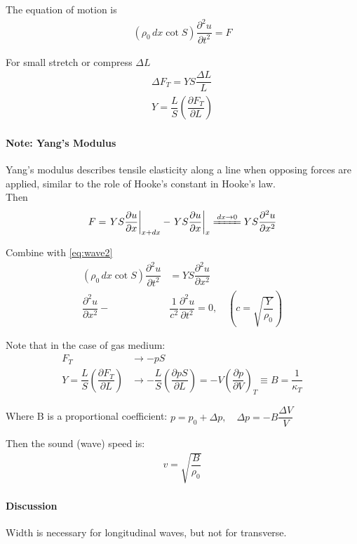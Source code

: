 \documentclass[11pt, a4paper, oneside]{book}
\def\D{\partial}
\numberwithin{equation}{section}%
\begin{document}
The equation of motion is
\begin{align}
	\left(\rho_0\,dx\cot S\right)\dfrac{\D^2 u}{\D t^2} = F \label{eq:wave2}
\end{align}

For small stretch or compress $ \Delta L $
\begin{align}
	\displaystyle{\Delta F_T = YS\dfrac{\Delta L}{L}}\\
	Y = \dfrac{L}{S}\left(\dfrac{\D F_T}{\D L}\right)
\end{align} 
\paragraph{Note: Yang's Modulus} Yang's modulus describes tensile elasticity along a line when opposing forces are applied, similar to the role of Hooke's constant in Hooke's law.\\
Then
\begin{align}
	F = \left.YS\dfrac{\D u}{\D x}\right|_{x+dx} - \left.YS\dfrac{\D u}{\D x}\right|_{x} \xlongequal{dx\rightarrow 0} YS\dfrac{\D^2 u}{\D x^2}
\end{align}

Combine with \ref{eq:wave2}
\begin{align}
	\left(\rho_0\,dx\cot S\right)\dfrac{\D^2 u}{\D t^2} &= YS\dfrac{\D^2 u}{\D x^2}\\
	\dfrac{\D^2 u}{\D x^2}-&\dfrac{1}{c^2}\dfrac{\D^2 u}{\D t^2} = 0,\quad \left(c = \sqrt{\dfrac{Y}{\rho_0}}\right)
\end{align}

Note that in the case of gas medium:
\begin{align}
	F_T &\longrightarrow -pS\\
	Y = \dfrac{L}{S}\left(\dfrac{\D F_T}{\D L}\right) &\longrightarrow -\dfrac{L}{S}\left(\dfrac{\D pS}{\D L}\right) = -V\left(\dfrac{\D p}{\D V}\right)_T \equiv B = \dfrac{1}{\kappa_T}
\end{align}

Where B is a proportional coefficient: $p = p_0 + \Delta p,\quad \Delta p = -B\dfrac{\Delta V}{V}$

Then the sound (wave) speed is:
\begin{align}
	v = \sqrt{\dfrac{B}{\rho_0}}
\end{align}

\paragraph{Discussion}
Width is necessary for longitudinal waves, but not for transverse. 

\end{document}
